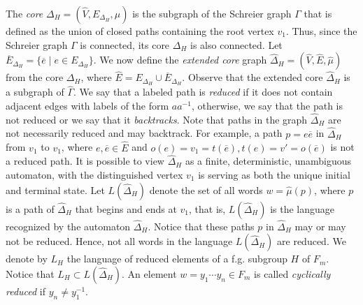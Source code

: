 \documentclass{article}
\begin{document}
The \emph{core} $\Delta_H = (\widehat{V},E_{\Delta_H},\mu)$ is the subgraph of the Schreier graph $\Gamma$ that is defined as the union of closed paths containing the root vertex $v_1$. Thus, since the Schreier graph $\Gamma$ is connected, its core $\Delta_H$ is also connected. Let $\overline{E}_{\Delta_H} = \{\overline{e}\mid e \in E_{\Delta_H}\}$. We now define the {\it extended core} graph $\widehat{\Delta}_H = (\widehat{V},\widehat{E},\widehat{\mu})$ from the core $\Delta_H$, where $\widehat{E} = E_{\Delta_H}\cup\overline{E}_{\Delta_H}$. Observe that the extended core $\widehat{\Delta}_H$ is a subgraph of $\widehat{\Gamma}.$ We say that a labeled path  is \emph{reduced} if it does not contain adjacent edges with labels of the form $aa^{-1}$, otherwise, we say that the path is not reduced or  we say that it \emph{backtracks}. Note that paths in the graph $\widehat{\Delta}_H$ are not necessarily reduced and may backtrack. For example, a path $p = e\overline{e}$ in $\widehat{\Delta}_H$ from $v_1$ to $v_1$, where $e, \overline{e} \in \widehat{E}$ and $o(e) = v_1 = t(\overline{e}), t(e) = v' = o(\overline{e})$ is not a reduced path. It is possible to view $\widehat{\Delta}_H$ as a finite, deterministic, unambiguous automaton, with the distinguished vertex $v_1$ is serving as both the unique initial and terminal state. Let $L(\widehat{\Delta}_H)$ denote the set of all words $w = \widehat{\mu}(p)$, where $p$ is a path of $\widehat{\Delta}_H$ that begins and ends at $v_1$, that is, $L(\widehat{\Delta}_H)$ is the language recognized by the automaton $\widehat{\Delta}_H.$ Notice that these paths $p$ in $\widehat{\Delta}_H$ may or may not be reduced. Hence, not all words in the language $L(\widehat{\Delta}_H)$ are reduced. We denote by $L_H$ the language of reduced elements of a f.g. subgroup $H$ of $F_m.$ Notice that $L_H \subset L(\widehat{\Delta}_H).$ An element $w = y_1\cdots y_n \in F_m$ is called \emph{cyclically reduced} if $y_n \neq y_1^{-1}.$
\end{document}

